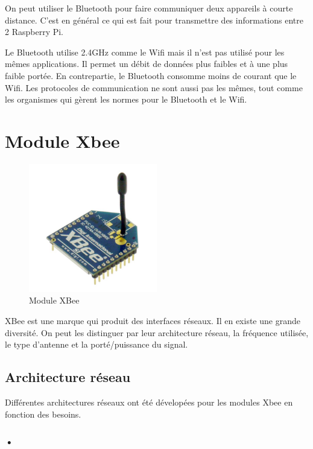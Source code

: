 \documentclass[a4paper, 11pt]{report}
\begin{document}
On peut utiliser le Bluetooth pour faire communiquer deux appareils à courte distance. C'est en général ce qui est fait pour transmettre des informations entre 2 Raspberry Pi.

Le Bluetooth utilise 2.4GHz comme le Wifi mais il n'est pas utilisé pour les mêmes applications. Il permet un débit de données plus faibles et à une plus faible portée. En contrepartie, le Bluetooth consomme moins de courant que le Wifi. Les protocoles de communication ne sont aussi pas les mêmes, tout comme les organismes qui gèrent les normes pour le Bluetooth et le Wifi.

\section{Module Xbee}

\begin{figure}[h!]
\begin{centering}
\includegraphics[width=0.5\textwidth]{images/XBee.jpg}
\caption{Module XBee}
\par\end{centering}
\end{figure}

XBee est une marque qui produit des interfaces réseaux. Il en existe une grande diversité. On peut les distinguer par leur architecture réseau, la fréquence utilisée, le type d'antenne et la porté/puissance du signal.

\subsection{Architecture réseau}
Différentes architectures réseaux ont été dévelopées pour les modules Xbee en fonction des besoins.
\subsubsection{•}
\end{document}
